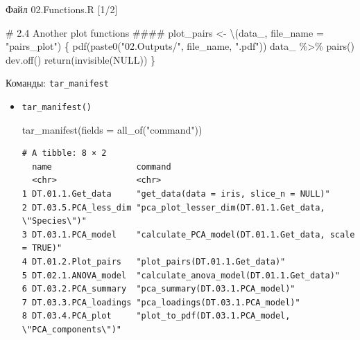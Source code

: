 \documentclass[
  ignorenonframetext,
]{beamer}
\newenvironment{Shaded}{\begin{snugshade}}{\end{snugshade}}
\newcommand{\AttributeTok}[1]{\textcolor[rgb]{0.40,0.45,0.13}{#1}}
\newcommand{\CommentTok}[1]{\textcolor[rgb]{0.37,0.37,0.37}{#1}}
\newcommand{\ConstantTok}[1]{\textcolor[rgb]{0.56,0.35,0.01}{#1}}
\newcommand{\FunctionTok}[1]{\textcolor[rgb]{0.28,0.35,0.67}{#1}}
\newcommand{\NormalTok}[1]{\textcolor[rgb]{0.00,0.23,0.31}{#1}}
\newcommand{\OtherTok}[1]{\textcolor[rgb]{0.00,0.23,0.31}{#1}}
\newcommand{\SpecialCharTok}[1]{\textcolor[rgb]{0.37,0.37,0.37}{#1}}
\newcommand{\StringTok}[1]{\textcolor[rgb]{0.13,0.47,0.30}{#1}}
\begin{document}
\begin{frame}[fragile]{Файл 02.Functions.R {[}1/2{]}}
\begin{Shaded}
\begin{Highlighting}[]
\CommentTok{\# 2.4 Another plot functions        \#\#\#\#}
\NormalTok{plot\_pairs }\OtherTok{\textless{}{-}}\NormalTok{ \textbackslash{}(data\_, }\AttributeTok{file\_name =} \StringTok{"pairs\_plot"}\NormalTok{) \{}
  \FunctionTok{pdf}\NormalTok{(}\FunctionTok{paste0}\NormalTok{(}\StringTok{"02.Outputs/"}\NormalTok{, file\_name, }\StringTok{".pdf"}\NormalTok{))}
\NormalTok{  data\_ }\SpecialCharTok{\%\textgreater{}\%} \FunctionTok{pairs}\NormalTok{()}
  \FunctionTok{dev.off}\NormalTok{()}
  \FunctionTok{return}\NormalTok{(}\FunctionTok{invisible}\NormalTok{(}\ConstantTok{NULL}\NormalTok{))}
\NormalTok{\}}
\end{Highlighting}
\end{Shaded}
\end{frame}

\begin{frame}[fragile]{Команды: \texttt{tar\_manifest}}
\label{ux43aux43eux43cux430ux43dux434ux44b-tar_manifest}
\begin{itemize}
\item
  \texttt{tar\_manifest()}

\begin{Shaded}
\begin{Highlighting}[]
\FunctionTok{tar\_manifest}\NormalTok{(}\AttributeTok{fields =} \FunctionTok{all\_of}\NormalTok{(}\StringTok{"command"}\NormalTok{))}
\end{Highlighting}
\end{Shaded}

\begin{verbatim}
# A tibble: 8 × 2
  name                 command                                              
  <chr>                <chr>                                                
1 DT.01.1.Get_data     "get_data(data = iris, slice_n = NULL)"              
2 DT.03.5.PCA_less_dim "pca_plot_lesser_dim(DT.01.1.Get_data, \"Species\")" 
3 DT.03.1.PCA_model    "calculate_PCA_model(DT.01.1.Get_data, scale = TRUE)"
4 DT.01.2.Plot_pairs   "plot_pairs(DT.01.1.Get_data)"                       
5 DT.02.1.ANOVA_model  "calculate_anova_model(DT.01.1.Get_data)"            
6 DT.03.2.PCA_summary  "pca_summary(DT.03.1.PCA_model)"                     
7 DT.03.3.PCA_loadings "pca_loadings(DT.03.1.PCA_model)"                    
8 DT.03.4.PCA_plot     "plot_to_pdf(DT.03.1.PCA_model, \"PCA_components\")" 
\end{verbatim}
\end{itemize}
\end{frame}
\end{document}
